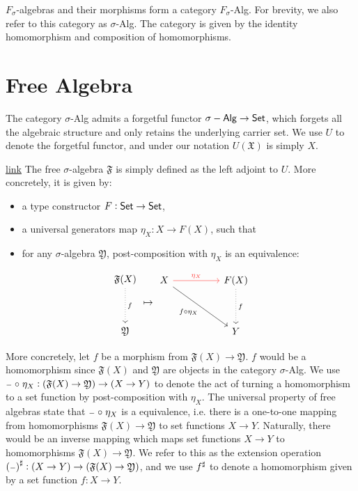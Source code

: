$F_{\sigma}$-algebras and their morphisms form a category $F_\sigma$-Alg.
For brevity, we also refer to this category as $\sigma$-Alg. The category
is given by the identity homomorphism and composition of homomorphisms.

\section{Free Algebra}\label{sec:universal-algebra:free-algebras}
The category $\sigma$-Alg admits a forgetful functor
$\sigma-\operatorname{\mathsf{Alg}} \to \mathsf{Set}$, which forgets all the algebraic structure
and only retains the underlying carrier set.
We use $U$ to denote the forgetful functor, and under our notation
$U(\mathfrak{X})$ is simply $X$.

\begin{definition}{\href{https://windtfw.com/agda-symmetries/Cubical.Structures.Free.html#819}{link}}
The free $\sigma$-algebra $\mathfrak{F}$ is simply defined as the left adjoint to $U$.
More concretely, it is given by:
\begin{itemize}
    \item a type constructor $F : \mathsf{Set} \to \mathsf{Set}$,
    \item a universal generators map $\eta_X : X \to F(X)$, such that
    \item for any $\sigma$-algebra $\mathfrak{Y}$, post-composition with $\eta_X$ is an equivalence:
\end{itemize}
\end{definition}
\[
\begin{tikzcd}[ampersand replacement=\&]
	\mathfrak{F}(X) \\
	\\
	\mathfrak{Y}
	\arrow["f", dotted, from=1-1, to=3-1]
\end{tikzcd}
\mapsto
\begin{tikzcd}[ampersand replacement=\&]
	X \&\& {F(X)} \\
	\\
	\&\& {Y}
	\arrow["\eta_X", color={rgb,255:red,255;green,54;blue,51}, from=1-1, to=1-3]
	\arrow["f \comp \eta_X"', from=1-1, to=3-3]
	\arrow["{f}", dotted, from=1-3, to=3-3]
\end{tikzcd}\]

More concretely, let $f$ be a morphism from $\mathfrak{F}(X) \to \mathfrak{Y}$.
$f$ would be a homomorphism since $\mathfrak{F}(X)$ and $\mathfrak{Y}$ are
objects in the category $\sigma$-Alg. 
We use
${\scriptstyle{-}} \mathrel{\circ} \eta_X : (\mathfrak{F}(X) \to \mathfrak{Y}) \to (X \to Y)$
to denote the act of turning a homomorphism to a set function by
post-composition with $\eta_X$.
The universal property of free algebras state that ${\scriptstyle{-}} \mathrel{\circ} \eta_X$
is a equivalence, i.e. there is a one-to-one mapping from
homomorphisms $\mathfrak{F}(X) \to \mathfrak{Y}$ to set functions $X \to Y$.
Naturally, there would be an inverse mapping which maps set functions $X \to Y$
to homomorphisms $\mathfrak{F}(X) \to \mathfrak{Y}$. We refer to this
as the extension operation ${({\scriptstyle{-}})}^{\sharp} : (X \to Y) \to (\mathfrak{F}(X) \to \mathfrak{Y})$,
and we use ${f}^{\sharp}$ to denote a homomorphism given by a set function $f : X \to Y$.

